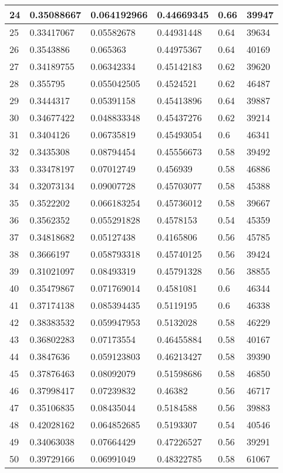\begin{longtable}{|l|l|l|l|l|l|}
24 & 0.35088667 & 0.064192966 & 0.44669345 & 0.66 & 39947 \\ \hline 
25 & 0.33417067 & 0.05582678 & 0.44931448 & 0.64 & 39634 \\ \hline 
26 & 0.3543886 & 0.065363 & 0.44975367 & 0.64 & 40169 \\ \hline 
27 & 0.34189755 & 0.06342334 & 0.45142183 & 0.62 & 39620 \\ \hline 
28 & 0.355795 & 0.055042505 & 0.4524521 & 0.62 & 46487 \\ \hline 
29 & 0.3444317 & 0.05391158 & 0.45413896 & 0.64 & 39887 \\ \hline 
30 & 0.34677422 & 0.048833348 & 0.45437276 & 0.62 & 39214 \\ \hline 
31 & 0.3404126 & 0.06735819 & 0.45493054 & 0.6 & 46341 \\ \hline 
32 & 0.3435308 & 0.08794454 & 0.45556673 & 0.58 & 39492 \\ \hline 
33 & 0.33478197 & 0.07012749 & 0.456939 & 0.58 & 46886 \\ \hline 
34 & 0.32073134 & 0.09007728 & 0.45703077 & 0.58 & 45388 \\ \hline 
35 & 0.3522202 & 0.066183254 & 0.45736012 & 0.58 & 39667 \\ \hline 
36 & 0.3562352 & 0.055291828 & 0.4578153 & 0.54 & 45359 \\ \hline 
37 & 0.34818682 & 0.05127438 & 0.4165806 & 0.56 & 45785 \\ \hline 
38 & 0.3666197 & 0.058793318 & 0.45740125 & 0.56 & 39424 \\ \hline 
39 & 0.31021097 & 0.08493319 & 0.45791328 & 0.56 & 38855 \\ \hline 
40 & 0.35479867 & 0.071769014 & 0.4581081 & 0.6 & 46344 \\ \hline 
41 & 0.37174138 & 0.085394435 & 0.5119195 & 0.6 & 46338 \\ \hline 
42 & 0.38383532 & 0.059947953 & 0.5132028 & 0.58 & 46229 \\ \hline 
43 & 0.36802283 & 0.07173554 & 0.46455884 & 0.58 & 40167 \\ \hline 
44 & 0.3847636 & 0.059123803 & 0.46213427 & 0.58 & 39390 \\ \hline 
45 & 0.37876463 & 0.08092079 & 0.51598686 & 0.58 & 46850 \\ \hline 
46 & 0.37998417 & 0.07239832 & 0.46382 & 0.56 & 46717 \\ \hline 
47 & 0.35106835 & 0.08435044 & 0.5184588 & 0.56 & 39883 \\ \hline 
48 & 0.42028162 & 0.064852685 & 0.5193307 & 0.54 & 40546 \\ \hline 
49 & 0.34063038 & 0.07664429 & 0.47226527 & 0.56 & 39291 \\ \hline 
50 & 0.39729166 & 0.06991049 & 0.48322785 & 0.58 & 61067 \\ \hline 
\end{longtable}